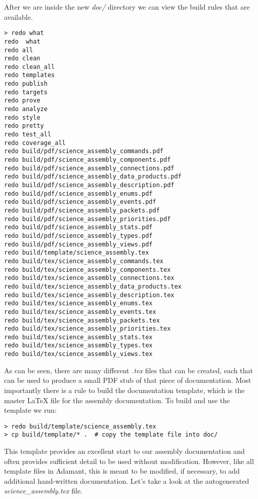 After we are inside the new \textit{doc/} directory we can view the build rules that are available.

\vspace{5mm} %
\begin{verbatim}
> redo what
redo  what
redo all
redo clean
redo clean_all
redo templates
redo publish
redo targets
redo prove
redo analyze
redo style
redo pretty
redo test_all
redo coverage_all
redo build/pdf/science_assembly_commands.pdf
redo build/pdf/science_assembly_components.pdf
redo build/pdf/science_assembly_connections.pdf
redo build/pdf/science_assembly_data_products.pdf
redo build/pdf/science_assembly_description.pdf
redo build/pdf/science_assembly_enums.pdf
redo build/pdf/science_assembly_events.pdf
redo build/pdf/science_assembly_packets.pdf
redo build/pdf/science_assembly_priorities.pdf
redo build/pdf/science_assembly_stats.pdf
redo build/pdf/science_assembly_types.pdf
redo build/pdf/science_assembly_views.pdf
redo build/template/science_assembly.tex
redo build/tex/science_assembly_commands.tex
redo build/tex/science_assembly_components.tex
redo build/tex/science_assembly_connections.tex
redo build/tex/science_assembly_data_products.tex
redo build/tex/science_assembly_description.tex
redo build/tex/science_assembly_enums.tex
redo build/tex/science_assembly_events.tex
redo build/tex/science_assembly_packets.tex
redo build/tex/science_assembly_priorities.tex
redo build/tex/science_assembly_stats.tex
redo build/tex/science_assembly_types.tex
redo build/tex/science_assembly_views.tex
\end{verbatim}
\vspace{5mm} %

As can be seen, there are many different \textit{.tex} files that can be created, each that can be used to produce a small PDF stub of that piece of documentation. Most importantly there is a rule to build the documentation template, which is the master \LaTeX{} file for the assembly documentation. To build and use the template we run:

\vspace{5mm} %
\begin{verbatim}
> redo build/template/science_assembly.tex
> cp build/template/* .  # copy the template file into doc/
\end{verbatim}
\vspace{5mm} %

This template provides an excellent start to our assembly documentation and often provides sufficient detail to be used without modification. However, like all template files in Adamant, this is meant to be modified, if necessary, to add additional hand-written documentation. Let's take a look at the autogenerated \textit{science\_assembly.tex} file. \\


